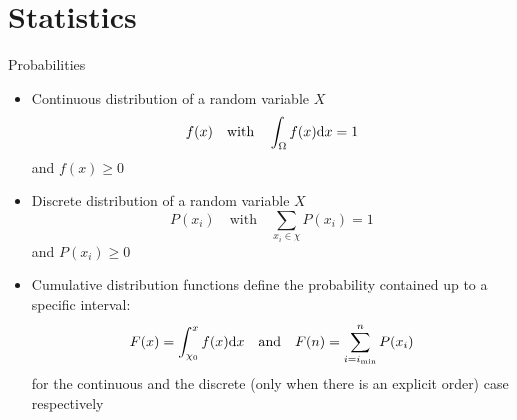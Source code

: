   \section{Statistics}
  \begin{frame}{Probabilities}
    \begin{itemize}
      \item Continuous distribution of a random variable $X$
        \begin{equation*}
          f(x) \quad\mathrm{with}\quad \int_\Omega f(x) \mathrm{d}x = 1
        \end{equation*}
        and $f(x) \geq 0$
      \item Discrete distribution of a random variable $X$
        \begin{equation*}
          P(x_i) \quad\mathrm{with}\quad \sum_{x_i\in\chi} P(x_i) = 1
        \end{equation*}
        and $P(x_i) \geq 0$
      \item Cumulative distribution functions define the probability contained up to a specific interval:
      \begin{equation*}
        F(x) = \int_{\chi_0}^x f(x) \mathrm{d}x
        \quad \mathrm{and} \quad
        F(n) = \sum_{i=i_\mathrm{min}}^n P(x_i)
      \end{equation*}
      for the continuous and the discrete (only when there is an explicit order) case respectively
    \end{itemize}
  \end{frame}

